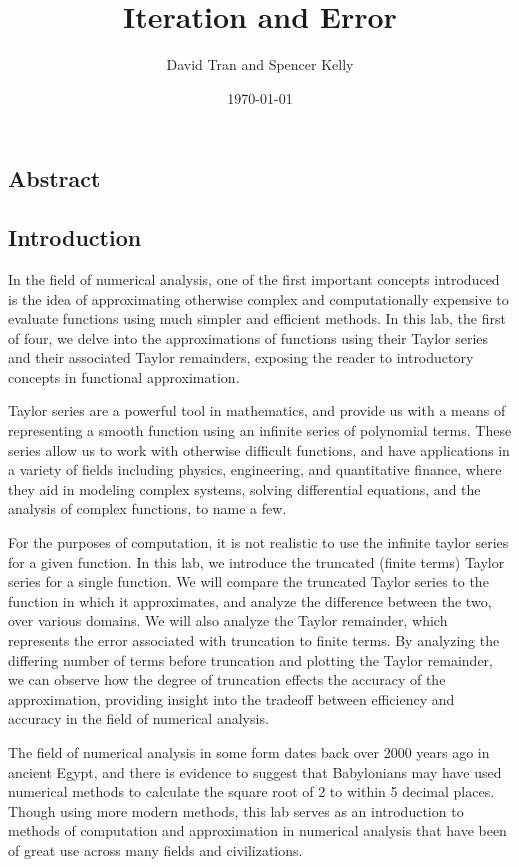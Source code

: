 \documentclass[letter,11pt]{article}
\title{Iteration and Error}
\author{David Tran and Spencer Kelly}
\date{\today}
\begin{document}
\maketitle

\subsection*{Abstract}

\subsection*{Introduction}
In the field of numerical analysis, one of the first important concepts introduced is the idea of approximating otherwise complex and computationally expensive to evaluate functions using much simpler and efficient methods.
In this lab, the first of four, we delve into the approximations of functions using their Taylor series and their associated Taylor remainders, exposing the reader to introductory concepts in functional approximation.

Taylor series are a powerful tool in mathematics, and provide us with a means of representing a smooth function using an infinite series of polynomial terms.
These series allow us to work with otherwise difficult functions, and have applications in a variety of fields including physics, engineering, and quantitative finance, where they aid in modeling complex systems, solving differential equations, and the analysis of complex functions, to name a few.

For the purposes of computation, it is not realistic to use the infinite taylor series for a given function.
In this lab, we introduce the truncated (finite terms) Taylor series for a single function.
We will compare the truncated Taylor series to the function in which it approximates, and analyze the difference between the two, over various domains.
We will also analyze the Taylor remainder, which represents the error associated with truncation to finite terms.
By analyzing the differing number of terms before truncation and plotting the Taylor remainder, we can observe how the degree of truncation effects the accuracy of the approximation, providing insight into the tradeoff between efficiency and accuracy in the field of numerical analysis.

The field of numerical analysis in some form dates back over 2000 years ago in ancient Egypt, and there is evidence to suggest that Babylonians may have used numerical methods to calculate the square root of 2 to within 5 decimal places.
Though using more modern methods, this lab serves as an introduction to methods of computation and approximation in numerical analysis that have been of great use across many fields and civilizations.
\end{document}
